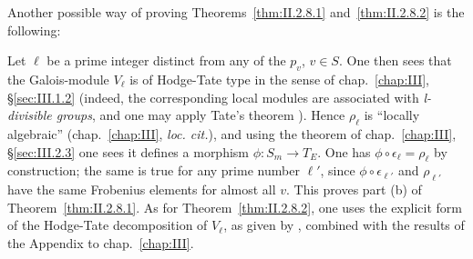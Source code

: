 
Another possible way of proving Theorems~\ref{thm:II.2.8.1}
and~\ref{thm:II.2.8.2} is the following:

Let $\ell$ be a prime integer distinct from any of the $p_v$,
$v \in S$.  One then sees that the Galois-module $V_\ell$ is of
Hodge-Tate type in the sense of chap.~\ref{chap:III},
\S\ref{sec:III.1.2} (indeed, the corresponding local modules are
associated with \emph{\textit{l}-divisible groups}, and one may apply
Tate's theorem \cite{tate-pdiv}).  Hence $\rho_\ell$ is ``locally
algebraic'' (chap.~\ref{chap:III}, \emph{loc. cit.}), and using the
theorem of chap.~\ref{chap:III}, \S\ref{sec:III.2.3} one sees it defines
a morphism $\phi\colon S_m \to T_E$.  One has
$\phi \circ \epsilon_\ell = \rho_\ell$ by construction; the same is true
for any prime number $\ell'$, since $\phi \circ \epsilon_{\ell'}$ and
$\rho_{\ell'}$ have the same Frobenius elements for almost all $v$.
This proves part (b) of Theorem~\ref{thm:II.2.8.1}.  As for
Theorem~\ref{thm:II.2.8.2}, one uses the explicit form of the
Hodge-Tate decomposition of $V_\ell$, as given by \cite{tate-pdiv},
combined with the results of the Appendix to chap.~\ref{chap:III}.
